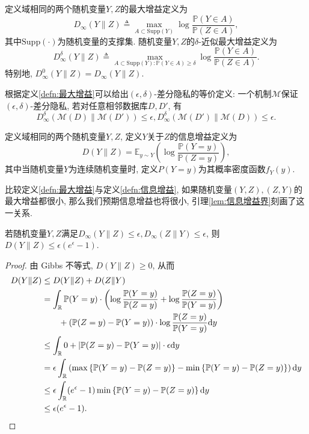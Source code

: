 \begin{defn}\label{defn:最大增益}
  定义域相同的两个随机变量$Y, Z$的最大增益定义为
  \[
  D_\infty(Y\|Z) \triangleq \max_{A \subset \mathrm{Supp}(Y)}\log\frac{\mathbb P(Y \in A)}{\mathbb P(Z\in A)},
  \]
  其中$\mathrm{Supp}(\cdot)$为随机变量的支撑集. 随机变量$Y, Z$的$\delta$-近似最大增益定义为
  \[
  D^\delta_\infty(Y\|Z) \triangleq \max_{A \subset \mathrm{Supp}(Y)\colon\mathbb P(Y \in A)\ge\delta}\log\frac{\mathbb P(Y \in A)}{\mathbb P(Z\in A)}.
  \]
  特别地, $D^0_\infty(Y\|Z) = D_\infty(Y\|Z)$.
\end{defn}
\begin{note}
  根据定义\ref{defn:最大增益}可以给出$(\epsilon, \delta)$-差分隐私的等价定义: 一个机制$\mathcal{M}$保证$(\epsilon, \delta)$-差分隐私, 若对任意相邻数据库$D, D'$, 有
  \[
  D^\delta_\infty(\mathcal{M}(D)\|\mathcal{M}(D'))\le\epsilon, D^\delta_\infty(\mathcal{M}(D')\|\mathcal{M}(D))\le\epsilon.
  \] 
\end{note}
\begin{defn}[信息增益]\label{defn:信息增益}
  定义域相同的两个随机变量$Y, Z$, 定义$Y$关于$Z$的信息增益定义为
  \[
    D(Y\|Z) = \mathbb{E}_{y\sim Y}\left( \log\frac{\mathbb P(Y = y)}{\mathbb P(Z = y)}\right),
  \]
  其中当随机变量$Y$为连续随机变量时, 定义$P(Y = y)$为其概率密度函数$f_Y(y)$.
\end{defn}
比较定义\ref{defn:最大增益}与定义\ref{defn:信息增益}, 如果随机变量$(Y, Z), (Z, Y)$的最大增益都很小, 那么我们预期信息增益也将很小, 引理\ref{lem:信息增益界}刻画了这一关系.
\begin{lem}\label{lem:信息增益界}
  若随机变量$Y, Z$满足$D_\infty(Y\|Z)\le\epsilon, D_\infty(Z\|Y)\le\epsilon$, 则$D(Y\|Z)\le\epsilon(e^\epsilon - 1)$.
\end{lem}
\begin{proof}
  由 Gibbs 不等式, $D(Y\|Z) \ge 0$, 从而
  \begin{align*}
    D(Y\|Z) &\le D(Y\|Z) + D(Z\|Y) \\
    &= \int_{\mathbb R} \mathbb P(Y = y) \cdot \left( \log\frac{\mathbb{P}(Y = y)}{\mathbb{P}(Z = y)} + \log\frac{\mathbb{P}(Z = y)}{\mathbb{P}(Y = y)} \right) \\
    &\qquad + (\mathbb P(Z = y) - \mathbb P(Y = y))\cdot\log\frac{\mathbb{P}(Z = y)}{\mathbb{P}(Y = y)} \mathrm{d}y\\
    &\le \int_{\mathbb R} 0 + |\mathbb{P}(Z = y) - \mathbb{P}(Y = y)|\cdot\epsilon \mathrm{d}y\\
    &= \epsilon \int_{\mathbb R} \left(\max\left\{\mathbb{P}(Y = y) - \mathbb{P}(Z=y)\right\}-\min\left\{\mathbb{P}(Y = y) - \mathbb{P}(Z=y)\right\}\right) \mathrm{d}y\\
    &\le \epsilon \int_{\mathbb R} (e^\epsilon - 1) \min\left\{\mathbb{P}(Y = y) - \mathbb{P}(Z=y)\right\} \mathrm{d}y\\
    &\le \epsilon(e^\epsilon - 1). \qedhere
  \end{align*}
\end{proof}

